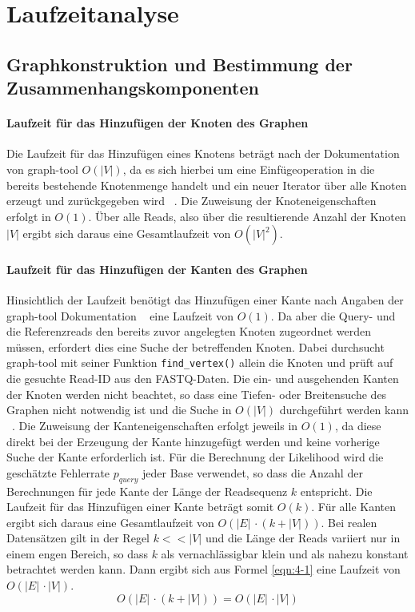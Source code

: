 \chapter{Laufzeitanalyse} \label{sec:}
\section{Graphkonstruktion und Bestimmung der Zusammenhangskomponenten} \label{sec:}
\subsubsection{Laufzeit für das Hinzufügen der Knoten des Graphen} \label{subsec:}
Die Laufzeit für das Hinzufügen eines Knotens beträgt nach der Dokumentation von graph-tool  $ O(|V|) $, da es sich hierbei um eine Einfügeoperation in die bereits bestehende Knotenmenge handelt und ein neuer Iterator über alle Knoten erzeugt und zurückgegeben wird ~\cite{docs_graph_tool}. Die Zuweisung der Knoteneigenschaften erfolgt in $ O(1) $. Über alle Reads, also über die resultierende Anzahl der Knoten $ |V| $ ergibt sich daraus eine Gesamtlaufzeit von $ O(|V|^2) $.\\

\subsubsection{Laufzeit für das Hinzufügen der Kanten des Graphen} \label{subsec:}

Hinsichtlich der Laufzeit benötigt das Hinzufügen einer Kante nach Angaben der graph-tool Dokumentation ~\cite{docs_graph_tool} eine Laufzeit von $ O(1) $. Da aber die Query- und die Referenzreads den bereits zuvor angelegten Knoten zugeordnet werden müssen, erfordert dies eine Suche der betreffenden Knoten. Dabei durchsucht graph-tool mit seiner Funktion \lstinline|find_vertex()| allein die Knoten und prüft auf die gesuchte Read-ID aus den FASTQ-Daten. Die ein- und ausgehenden Kanten der Knoten werden nicht beachtet, so dass eine Tiefen- oder Breitensuche des Graphen nicht notwendig ist und die Suche in $ O(|V|) $ durchgeführt werden kann ~\cite{graph_tool_coplexity_find_vertex}. Die Zuweisung der Kanteneigenschaften erfolgt jeweils in $ O(1) $, da diese direkt bei der Erzeugung der Kante hinzugefügt werden und keine vorherige Suche der Kante erforderlich ist. Für die Berechnung der Likelihood wird die geschätzte Fehlerrate $ p_{query} $ jeder Base verwendet, so dass die Anzahl der Berechnungen für jede Kante der Länge der Readsequenz $ k $ entspricht. Die Laufzeit für das Hinzufügen einer Kante beträgt somit $ O(k) $. Für alle Kanten ergibt sich daraus eine Gesamtlaufzeit von $ O(|E|\, \cdotp (k + |V|)) $. Bei realen Datensätzen gilt in der Regel $ k << |V| $ und die Länge der Reads variiert nur in einem engen Bereich, so dass $ k $ als vernachlässigbar klein und als nahezu konstant betrachtet werden kann. Dann ergibt sich aus Formel \eqref{eqn:4-1} eine Laufzeit von $O(|E|\, \cdotp |V|) $. 
\begin{equation} \label{eqn:4-1}
\tag{4-1}
O(|E|\, \cdotp (k + |V|)) = O(|E|\, \cdotp |V|)
\end{equation}

